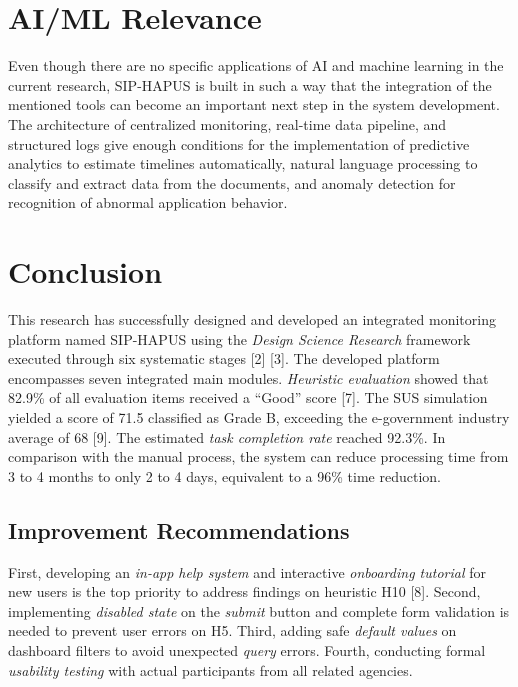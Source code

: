 \documentclass[conference,a4paper]{IEEEtran}
\begin{document}
\section{AI/ML Relevance}\label{subsec:ai-ml-relevance}

Even though there are no specific applications of AI and machine learning in the current research, SIP-HAPUS is built in such a way that the integration of the mentioned tools can become an important next step in the system development. The architecture of centralized monitoring, real-time data pipeline, and structured logs give enough conditions for the implementation of predictive analytics to estimate timelines automatically, natural language processing to classify and extract data from the documents, and anomaly detection for recognition of abnormal application behavior.

\section{Conclusion}
\label{sec:conclusion}

This research has successfully designed and developed an integrated monitoring platform named SIP-HAPUS using the \emph{Design Science Research} framework executed through six systematic stages [2] [3]. The developed platform encompasses seven integrated main modules. \emph{Heuristic evaluation} showed that 82.9\% of all evaluation items received a ``Good'' score [7]. The SUS simulation yielded a score of 71.5 classified as Grade B, exceeding the e-government industry average of 68 [9]. The estimated \emph{task completion rate} reached 92.3\%. In comparison with the manual process, the system can reduce processing time from 3 to 4 months to only 2 to 4 days, equivalent to a 96\% time reduction.

\subsection{Improvement Recommendations}
\label{subsec:recommendations}

First, developing an \emph{in-app help system} and interactive \emph{onboarding tutorial} for new users is the top priority to address findings on heuristic H10 [8]. Second, implementing \emph{disabled state} on the \emph{submit} button and complete form validation is needed to prevent user errors on H5. Third, adding safe \emph{default values} on dashboard filters to avoid unexpected \emph{query} errors. Fourth, conducting formal \emph{usability testing} with actual participants from all related agencies.
\end{document}
